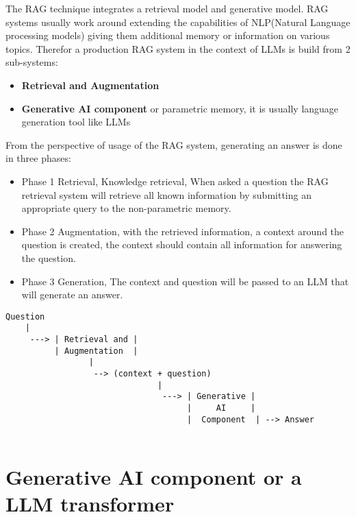 \documentclass[11pt]{wseas}
\begin{document}
The RAG technique integrates a retrieval model and generative model. RAG
systems usually work around extending the capabilities of NLP(Natural
Language processing models) giving them additional memory or information
on various topics. Therefor a production RAG system in the context of
LLMs is build from 2 sub-systems:

\begin{itemize}
\tightlist
\item
  \textbf{Retrieval and Augmentation}
\item
  \textbf{Generative AI component} or parametric memory, it is usually
  language generation tool like LLMs
\end{itemize}

\newpage

From the perspective of usage of the RAG system, generating an answer is
done in three phases:

\begin{itemize}
\tightlist
\item
  Phase 1 Retrieval, Knowledge retrieval, When asked a question the RAG
  retrieval system will retrieve all known information by submitting an
  appropriate query to the non-parametric memory.
\item
  Phase 2 Augmentation, with the retrieved information, a context around
  the question is created, the context should contain all information
  for answering the question.
\item
  Phase 3 Generation, The context and question will be passed to an LLM
  that will generate an answer.
\end{itemize}

\begin{verbatim}
Question  
    |
     ---> | Retrieval and | 
          | Augmentation  |
                 |
                  --> (context + question)
                               |
                                ---> | Generative |
                                     |     AI     |
                                     |  Component  | --> Answer             
              
\end{verbatim}

    \newpage

\section{Generative AI component or a LLM
transformer}\label{generative-ai-component-or-a-llm-transformer}
\end{document}
